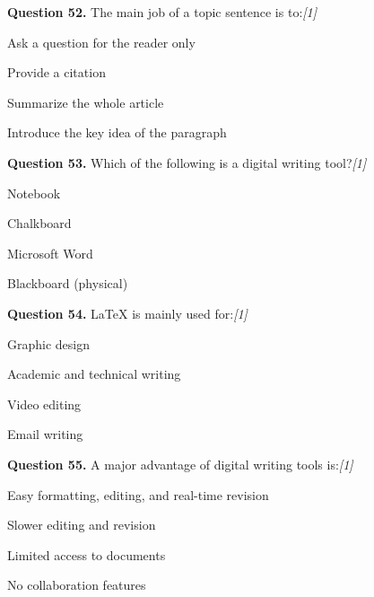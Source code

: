 \documentclass[11pt,a4paper]{article}
\newcommand{\pts}[1]{\hfill   \textit{[#1]}}
\begin{document}
\medskip




\noindent   \textbf{Question 52.} The main job of a topic sentence is to:\pts{1}

\begin{parts}
  \item Ask a question for the reader only
  \item Provide a citation
  \item Summarize the whole article
  \item Introduce the key idea of the paragraph
\end{parts}

\medskip




\noindent   \textbf{Question 53.} Which of the following is a digital writing tool?\pts{1}

\begin{parts}
  \item Notebook
  \item Chalkboard
  \item Microsoft Word
  \item Blackboard (physical)
\end{parts}

\medskip




\noindent   \textbf{Question 54.} LaTeX is mainly used for:\pts{1}

\begin{parts}
  \item Graphic design
  \item Academic and technical writing
  \item Video editing
  \item Email writing
\end{parts}

\medskip




\noindent   \textbf{Question 55.} A major advantage of digital writing tools is:\pts{1}

\begin{parts}
  \item Easy formatting, editing, and real-time revision
  \item Slower editing and revision
  \item Limited access to documents
  \item No collaboration features
\end{parts}
\end{document}
